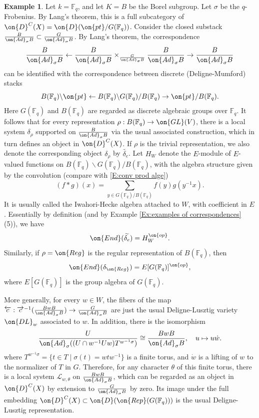 \documentclass[11pt]{amsart}
\theoremstyle{definition}
\theoremstyle{definition}
\newtheorem{ex}[thm]{Example}
\theoremstyle{definition}
\numberwithin{equation}{subsection}
\newcommand{\bF}{{\mathbb F}}
\newcommand{\mL}{{\mathcal L}}
\newcommand{\Ad}{{\on{Ad}}}
\newcommand{\End}{{\on{End}}}
\newcommand{\GL}{{\on{GL}}}
\begin{document}
\begin{ex}
\label{Ex:DL}
Let $k=\bF_q$, and let $K=B$ be the Borel subgroup.  Let $\sigma$ be the $q$-Frobenius. By Lang's theorem, this is a full subcategory of $\on{D}^C(X)=\on{D}(\on{pt}/G(\bF_q))$.
Consider the closed substack $\frac{B}{\Ad_\sigma B}\subset \frac{G}{\Ad_\sigma B}$. By Lang's theorem, the correspondence
\[\frac{B}{\Ad_\sigma B}\leftarrow\frac{B}{\Ad_\sigma B}\times_{\frac{G}{\Ad_\sigma B}}\frac{B}{\Ad_\sigma B}\rightarrow \frac{B}{\Ad_\sigma B}\]
can be identified with the correspondence between discrete (Deligne-Mumford) stacks
\begin{equation}
\label{E:Hk for unit}
B(\bF_q)\backslash \on{pt}\leftarrow B(\bF_q)\backslash G(\bF_q)/B(\bF_q)\rightarrow \on{pt}/B(\bF_q).
\end{equation}
Here $G(\bF_q)$ and $B(\bF_q)$ are regarded as discrete algebraic groups over $\bF_q$.
It follows that for every representation $\rho: B(\bF_q)\to \GL(V)$, there is a local system $\delta_\rho$ supported on $\frac{B}{\Ad_\sigma B}$ via the usual associated construction, which in turn defines an object in $\on{D}^C(X)$. If $\rho$ is the trivial representation, we also denote the corresponding object $\delta_\rho$ by $\widetilde{\delta_e}$. 
Let $H_W$ denote the $E$-module of $E$-valued functions on $B(\bF_q)\backslash G(\bF_q)/B(\bF_q)$, with the algebra structure given by the convolution (compare with \eqref{E:conv prod alge})
\[(f*g)(x)=\sum_{y\in G(\bF_q)/B(\bF_q)} f(y)g(y^{-1}x).\]
It is usually called the Iwahori-Hecke algebra attached to $W$,  with coefficient in $E$. Essentially by definition (and by Example \ref{Ex:examples of correspondences} (5)), we have
\begin{equation} 
\label{E:endo for unit}
\End(\widetilde{\delta_{e}})=H^{\on{op}}_W.
\end{equation}
Similarly, if $\rho=\on{Reg}$ is the regular representation of $B(\bF_q)$, then 
\begin{equation} 
\label{E:endo for reg}
\End(\delta_{\on{Reg}})=E[G(\bF_q)]^{\on{op}},
\end{equation} 
where $E[G(\bF_q)]$ is the group algebra of $G(\bF_q)$.


More generally, for every $w\in W$, the fibers of the map $\overleftarrow{c}: \overrightarrow{c}^{-1}(\frac{BwB}{\Ad_\sigma B})\to \frac{G}{\Ad_\sigma B}$ are just the usual Deligne-Lusztig variety $\on{DL}_w$ associated to $w$.
In addition, there is the isomorphism
\[  \frac{U}{\Ad_\sigma ((U \cap w^{-1}Uw)T^{w^{-1}\sigma})}\cong \frac{BwB}{\Ad_\sigma B},\quad u\mapsto u\dot{w}.\]
where $T^{w^{-1}\sigma}=\{t\in T\mid \sigma(t)=wtw^{-1}\}$ is a finite torus, and $\dot{w}$ is a lifting of $w$ to the normalizer of $T$ in $G$.
Therefore, for any character $\theta$ of this finite torus, there is a local system $\mL_{w,\theta}$ on  $\frac{BwB}{\Ad_\sigma B}$, which can be regarded as an object in $\on{D}^{C}(X)$ by extension to $\frac{G}{\Ad_\sigma B}$ by zero.
Its image under the full embedding $\on{D}^{C}(X)\subset \on{D}(\on{Rep}(G(\bF_q)))$ is the usual Deligne-Lusztig representation.
\end{ex}
\end{document}
